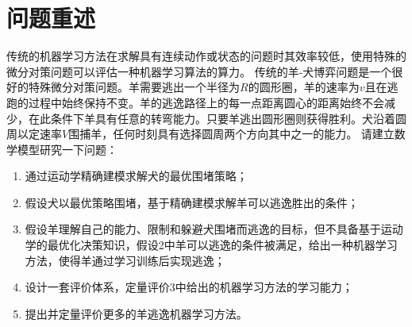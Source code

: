 \section{\centering 问题重述}
\indent
传统的机器学习方法在求解具有连续动作或状态的问题时其效率较低，使用特殊的微分对策问题可以评估一种机器学习算法的算力。
\zhcrlf 传统的羊-犬博弈问题是一个很好的特殊微分对策问题。羊需要逃出一个半径为$R$的圆形圈，羊的速率为$v$且在逃跑的过程中始终保持不变。羊的逃逸路径上的每一点距离圆心的距离始终不会减少，在此条件下羊具有任意的转弯能力。只要羊逃出圆形圈则获得胜利。犬沿着圆周以定速率$V$围捕羊，任何时刻具有选择圆周两个方向其中之一的能力。
\zhcrlf 请建立数学模型研究一下问题：
\begin{enumerate}[nosep]
    \item 通过运动学精确建模求解犬的最优围堵策略；
    \item 假设犬以最优策略围堵，基于精确建模求解羊可以逃逸胜出的条件；
    \item 假设羊理解自己的能力、限制和躲避犬围堵而逃逸的目标，但不具备基于运动学的最优化决策知识，假设2中羊可以逃逸的条件被满足，给出一种机器学习方法，使得羊通过学习训练后实现逃逸；
    \item 设计一套评价体系，定量评价3中给出的机器学习方法的学习能力；
    \item 提出并定量评价更多的羊逃逸机器学习方法。
\end{enumerate}